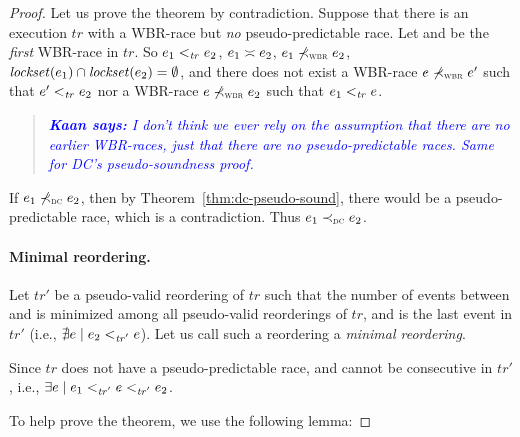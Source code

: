 \documentclass[letter,10pt]{article}
\newcommand{\lockset}[1]{\ensuremath{\mathit{lockset}(#1)}\xspace}
\newcommand{\commonLocks}[2]{\ensuremath{\lockset{#1} \cap \lockset{#2}}}
\newcommand{\conflicts}[2]{\ensuremath{#1 \asymp #2}} %
\newcommand{\tr}{\ensuremath{\mathit{tr}}\xspace}
\newcommand{\trPrime}{\ensuremath{\mathit{tr'}}\xspace}
\newcommand{\WDC}{DC\xspace}
\newcommand{\BR}{BR\xspace}
\newcommand{\WBR}{W\BR}
\newcommand{\DC}{\WDC}
\newcommand{\DCOrdered}[2]{\WDCOrdered{#1}{#2}}
\newcommand{\nDCOrdered}[2]{\nWDCOrdered{#1}{#2}}
\newcommand{\ltTR}{\ensuremath{<_\textsc{\tr}}\xspace}
\newcommand{\ltTRPrime}{\ensuremath{<_\textsc{\trPrime}}\xspace}
\newcommand{\ltWDC}{\ensuremath{\prec_\textsc{\tiny{\WDC}}}\xspace}
\newcommand{\nltWDC}{\ensuremath{\not\prec_\textsc{\tiny{\WDC}}}\xspace}
\newcommand{\ltWBR}{\ensuremath{\prec_\textsc{\tiny{\WBR}}}\xspace}
\newcommand{\nltWBR}{\ensuremath{\not\prec_\textsc{\tiny{\WBR}}}\xspace}
\newcommand{\Ordered}[3]{\ensuremath{#1 #2 #3}}
\newcommand{\TROrdered}[2]{\Ordered{#1}{\ltTR}{#2}}
\newcommand{\TRPrimeOrdered}[2]{\Ordered{#1}{\ltTRPrime}{#2}}
\newcommand{\WDCOrdered}[2]{\Ordered{#1}{\ltWDC}{#2}}
\newcommand{\nWDCOrdered}[2]{\Ordered{#1}{\nltWDC}{#2}}
\newcommand{\WBROrdered}[2]{\Ordered{#1}{\ltWBR}{#2}}
\newcommand{\nWBROrdered}[2]{\Ordered{#1}{\nltWBR}{#2}}
\newcommand{\originalgrumbler}[2]{\begin{quote}\textcolor{blue}{\sl{\bf #1 says:} #2}\end{quote}}
\newcommand{\grumbler}[2]{\originalgrumbler{#1}{#2}}
\newcommand{\mike}[1]{\grumbler{Mike}{#1}}
\newcommand{\kaan}[1]{\grumbler{Kaan}{#1}}
\begin{document}
\begin{proof}

Let us prove the theorem by contradiction. Suppose that there is an execution \tr
with a \WBR-race but \emph{no} pseudo-predictable race.
Let  and  be the \emph{first} \WBR-race in \tr.
So
\TROrdered{\event{e}{_1}}{\event{e}{_2}},
\conflicts{\event{e}{_1}}{\event{e}{_2}},
\nWBROrdered{\event{e}{_1}}{\event{e}{_2}},
$\commonLocks{\event{e}{_1}}{\event{e}{_2}} = \emptyset$,
and there does not exist a \WBR-race \nWBROrdered{\event{e}{}}{\event{e}{'}} such that \TROrdered{\event{e}{'}}{\event{e}{_2}}
nor a \WBR-race \nWBROrdered{\event{e}{}}{\event{e}{_2}} such that
\TROrdered{\event{e}{_1}}{\event{e}{}}.
\kaan{I don't think we ever rely on the assumption that there are no earlier
  \WBR-races, just that there are no pseudo-predictable races. Same for \DC's
  pseudo-soundness proof.}

If \nDCOrdered{\event{e}{_1}}{\event{e}{_2}}, then
by Theorem~\ref{thm:dc-pseudo-sound}, there would be a pseudo-predictable race,
which is a contradiction.
Thus \DCOrdered{\event{e}{_1}}{\event{e}{_2}}.

\paragraph{Minimal reordering.}

Let \trPrime be a pseudo-valid reordering of \tr such that the number of events
between  and  is minimized among all pseudo-valid
reorderings of \tr, and  is the last event in \trPrime
(i.e., $\nexists \event{e} \mid \TRPrimeOrdered{\event{e}{_2}}{\event{e}}$).
Let us call such a reordering a \emph{minimal reordering}.

Since \tr does not have a pseudo-predictable race,
 and  cannot be consecutive in \trPrime,
i.e., $\exists \event{e}{} \mid \TRPrimeOrdered{\event{e}{_1}}{\TRPrimeOrdered{\event{e}{}}{\event{e}{_2}}}$.


To help prove the theorem, we use the following lemma:


\end{proof}
\end{document}
